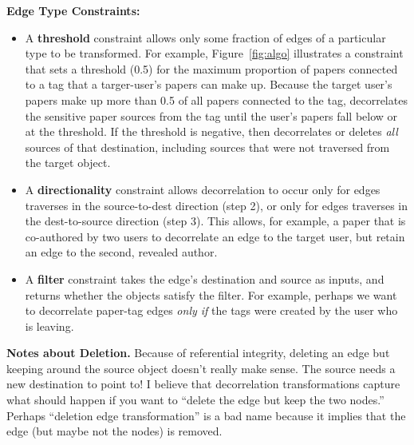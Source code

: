 \vspace{\baselineskip}\noindent\textbf{Edge Type Constraints:}
\begin{itemize}[nosep]
    \item A \textbf{threshold} constraint allows only some fraction of edges of a particular type to be
        transformed. 
    For example, Figure~\ref{fig:algo} illustrates a constraint that sets a threshold (0.5) for the
    maximum proportion of papers connected to a tag that a targer-user's papers can make up.
    Because the target user's papers make up more than 0.5 of all papers connected to the tag,
    \sys decorrelates the sensitive paper sources from the tag until the user's papers fall
    below or at the threshold.
    If the threshold is negative, then \sys decorrelates or deletes \emph{all} sources of that
    destination, including sources that were not traversed from the target object.

\item A \textbf{directionality} constraint allows decorrelation to occur only for edges \sys traverses
    in the source-to-dest direction (step 2), or only for edges \sys traverses in the dest-to-source
    direction (step 3). This allows, for example, a paper that is co-authored by two users to
    decorrelate an edge to the target user, but retain an edge to the second, revealed author.

\item A \textbf{filter} constraint takes the edge's destination and source as inputs, and returns whether the objects satisfy the
    filter. 
    For example, perhaps we want to decorrelate paper-tag edges
    \emph{only if} the tags were created by the user who is leaving.
\end{itemize}

\vspace{0.5\baselineskip}\noindent\textbf{Notes about Deletion.}
    Because of referential integrity, deleting an edge but keeping around the source object
    doesn't really make sense. The source needs a new destination to point to! I believe that
    decorrelation transformations capture what should happen if you want to ``delete the edge
    but keep the two nodes.'' Perhaps ``deletion edge transformation'' is a bad name because it
    implies that the edge (but maybe not the nodes) is removed.

